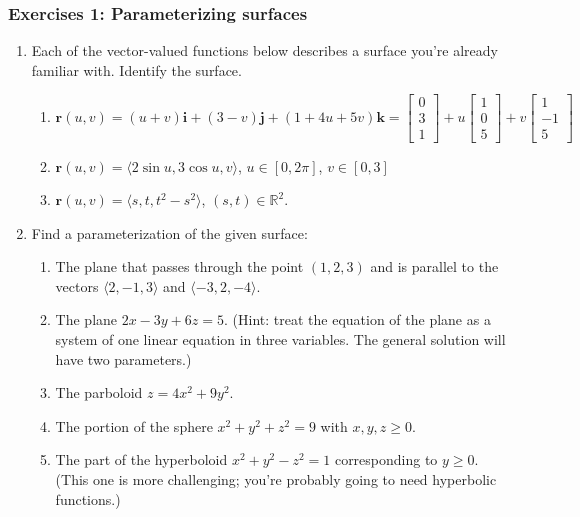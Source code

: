 \documentclass[12pt,letterpaper]{article}
\newcommand{\di}{\displaystyle}
\newcommand{\R}{\mathbb{R}}
\renewcommand{\r}{\mathbf{r}}
\renewcommand{\i}{\mathbf{i}}
\renewcommand{\j}{\mathbf{j}}
\renewcommand{\k}{\mathbf{k}}
\begin{document}
\subsubsection{Exercises 1: Parameterizing surfaces}
\begin{enumerate}
 \item Each of the vector-valued functions below describes a surface you're already familiar with. Identify the surface.
\begin{enumerate}
 \item $\di \r(u,v) = (u+v)\i+(3-v)\j+(1+4u+5v)\k = \begin{bmatrix}0\\3\\1\end{bmatrix}+u\begin{bmatrix}1\\0\\5\end{bmatrix}+v\begin{bmatrix}1\\-1\\5\end{bmatrix}$
 \item $\di \r(u,v) = \langle 2\sin u, 3\cos u, v\rangle$, $u\in [0,2\pi]$, $v\in [0,3]$
 \item $\di \r(u,v) = \langle s, t, t^2-s^2\rangle$, $(s,t)\in \R^2$.
\end{enumerate}
 \item Find a parameterization of the given surface:
\begin{enumerate}
 \item The plane that passes through the point $(1,2,3)$ and is parallel to the vectors $\langle 2,-1,3\rangle$ and $\langle -3, 2, -4\rangle$.
 \item The plane $2x-3y+6z=5$. (Hint: treat the equation of the plane as a system of one linear equation in three variables. The general solution will have two parameters.)
 \item The parboloid $z=4x^2+9y^2$.
 \item The portion of the sphere $x^2+y^2+z^2=9$ with $x,y,z\geq 0$.
 \item The part of the hyperboloid $x^2+y^2-z^2=1$ corresponding to $y\geq 0$. (This one is more challenging; you're probably going to need hyperbolic functions.)
\end{enumerate}

\end{enumerate}
\end{document}
